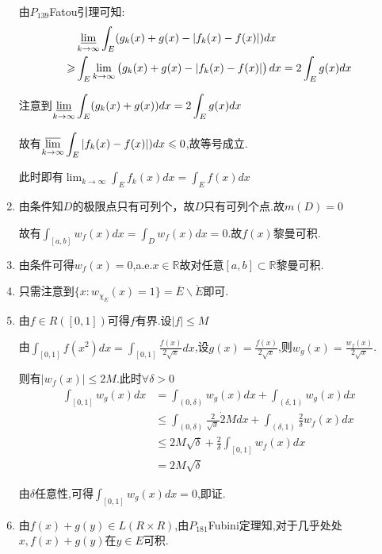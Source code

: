 \documentclass[UTF8, a4paper, 12pt, oneside, onecolumn]{article}
\numberwithin{equation}{section}
\numberwithin{figure}{section}
\numberwithin{table}{section}
\theoremstyle{nonumberplain}	%
\theoremstyle{plain}	%
\theoremstyle{plain}	%
\theoremstyle{plain}	%
\theoremstyle{plain}	%
\theoremstyle{nonumberplain}
\begin{document}
\begin{enumerate}
	由$P_{139}$Fatou引理可知:
	\begin{align*}
		&\displaystyle\varliminf_{k\rightarrow \infty}\int_E(g_k(x)+g(x)-|f_k(x)-f(x)|)dx\\
		\geqslant &\int_E\lim_{k\rightarrow \infty}\left(g_k(x)+g(x)-|f_k(x)-f(x)|\right)dx=2\int_Eg(x)dx
	\end{align*}
	
	注意到$\displaystyle\varliminf_{k\rightarrow \infty}\int_E(g_k(x)+g(x))dx=2\int_Eg(x)dx$
	
	故有$\displaystyle\varlimsup_{k\rightarrow \infty}\int_E|f_k(x)-f(x)|)dx\leqslant 0$,故等号成立.
	
	此时即有$\displaystyle\lim_{k\rightarrow \infty}\int_Ef_k(x)dx=\int_Ef(x)dx$
	
	\item 由条件知$D$的极限点只有可列个，故$D$只有可列个点.故$m(D)=0$
	
	故有$\displaystyle\int_{[a,b]}w_f(x)dx=\int_{D}w_f(x)dx=0$.故$f(x)$黎曼可积.
	
	\item 由条件可得$w_f(x)=0$,a.e.$x\in \mathbb{R}$故对任意$[a,b]\subset \mathbb{R}$黎曼可积.
	
	\item 只需注意到$\displaystyle\{x:w_{\chi_{E}}(x)=1\}=\overline{E}\backslash\mathring{E}$即可.
	
	\item 由$f\in R([0,1])$可得$f$有界.设$|f|\leqslant M$
	
	由$\displaystyle\int_{[0,1]}f(x^2)dx=\int_{[0,1]}\frac{f(x)}{2\sqrt{x}}dx$,设$\displaystyle g(x)=\frac{f(x)}{2\sqrt{x}}$,则$\displaystyle w_g(x)=\frac{w_f(x)}{2\sqrt{x}}$.
	
	则有$|w_f(x)|\leqslant2M.$此时$\forall\delta>0$
	\begin{align*}
	\int_{[0,1]}w_g(x)dx&=\int_{(0,\delta)}w_g(x)dx+\int_{(\delta,1)}w_g(x)dx\\
	&\leqslant\int_{(0,\delta)}\frac{2}{\sqrt{x}}\dot 2Mdx+\int_{(\delta,1)}\frac{2}{\delta}w_f(x)dx\\
	&\leqslant 2M\sqrt\delta+\frac{2}{\delta}\int_{[0,1]}w_f(x)dx\\
	&=2M\sqrt\delta
	\end{align*}
	
	由$\delta$任意性,可得$\displaystyle\int_{[0,1]}w_g(x)dx=0$,即证.
	
	\item 由$f(x)+g(y)\in L(R\times R)$,由$P_{181}$Fubini定理知,对于几乎处处$x,f(x)+g(y)$在$y\in E$可积.
	

\end{enumerate}
\end{document}
